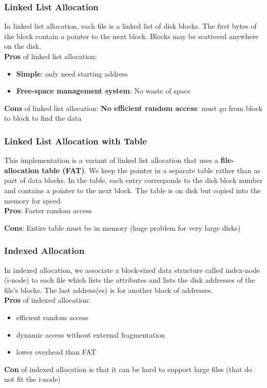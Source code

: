 \documentclass{article}
\newcommand{\bold}[1]{\textbf{#1}}
\renewcommand{\b}{\item[$\circ$]}
\newcommand{\newlist}{\begin{itemize}}
\renewcommand{\endlist}{\end{itemize}}
\begin{document}
\subsubsection{Linked List Allocation}

In linked list allocation, each file is a linked list of disk blocks. The first bytes of the block contain a pointer to the next block. Blocks may be scattered anywhere on the disk. \\

\bold{Pros} of linked list allocation:

\newlist 
\b \bold{Simple}: only need starting address
\b \bold{Free-space management system}: No waste of space
\endlist

\bold{Cons} of linked list allocation: \bold{No efficient random access}: must go from block to block to find the data

\subsubsection{Linked List Allocation with Table}

This implementation is a variant of linked list allocation that uses a \bold{file-allocation table (FAT)}. We keep the pointer in a separate table rather than as part of data blocks. In the table, each entry corresponds to the disk block number and contains a pointer to the next block. The table is on disk but copied into the memory for speed. \\ 

\bold{Pros}: Faster random access

\bold{Cons}: Entire table must be in memory (huge problem for very large disks)

\subsubsection{Indexed Allocation}

In indexed allocation, we associate a block-sized data structure called index-node (i-node) to each file which lists the attributes and lists the disk addresses of the file's blocks. The last address(es) is for another block of addresses. \\

\bold{Pros} of indexed allocation:

\newlist 
\b efficient random access
\b dynamic access without external fragmentation
\b lower overhead than FAT
\endlist

\bold{Con} of indexed allocation is that it can be hard to support large files (that do not fit the i-node) \\ 
\end{document}
